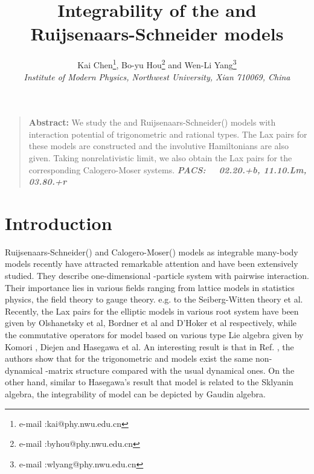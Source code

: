 \documentclass[a4paper,12pt]{article}
\providecommand{\sect}[1]{\setcounter{equation}{0}\section{#1}}
\begin{document}
\title{\textbf{Integrability of the \coordHE{} and \coordHE{} Ruijsenaars-Schneider
models}}
\author{Kai Chen\thanks{
e-mail :kai@phy.nwu.edu.cn}, Bo-yu Hou\thanks{
e-mail :byhou@phy.nwu.edu.cn} and Wen-Li Yang\thanks{
e-mail :wlyang@phy.nwu.edu.cn} \\
{\small \textit{Institute of Modern Physics, Northwest University, Xian
710069, China }}}
\date{}
\maketitle

\begin{quote}
{\bf Abstract:} We study the \coordHE{} and \coordHE{} Ruijsenaars-Schneider(\coordHE{}) models with
interaction potential of trigonometric and rational types. The Lax pairs for
these models are constructed and the involutive Hamiltonians are also given.
Taking nonrelativistic limit, we also obtain the Lax pairs for the
corresponding Calogero-Moser systems.\newline
\textbf{\textsl{\noindent PACS: \ \ 02.20.+b, 11.10.Lm, 03.80.+r}}
\end{quote}
\sect{Introduction}
Ruijsenaars-Schneider(\coordHE{}) and Calogero-Moser(\coordHE{}) models
as integrable many-body models recently have attracted remarkable attention
and have been extensively studied. They describe one-dimensional \coordHE{}%
-particle system with pairwise interaction. Their importance lies in various
fields ranging from lattice models in statistics physics\cite{h1, nksr}, the
field theory to gauge theory\cite{gm, n}. e.g. to the Seiberg-Witten theory
\cite{bmmm} et al. Recently, the Lax pairs for the elliptic \coordHE{} models in
various root system have been given by Olshanetsky et al\cite{op}, Bordner
et al\cite{bcs,bcs2,bcs3,bcs1} and D'Hoker et al\cite{hp1} respectively,
while the commutative operators for \coordHE{} model based on various type Lie
algebra given by Komori \cite{ko1, ko2}, Diejen\cite{di, di1} and Hasegawa%
\cite{h1, h2}et al. An interesting result is that in Ref. \cite{kai1}, the
authors show that for the \coordHE{} trigonometric \coordHE{} and \coordHE{} models exist the
same non-dynamical \coordHE{} -matrix structure compared with the usual dynamical
ones. On the other hand, similar to Hasegawa's result that \coordHE{}  \coordHE{}
model is related  to the \coordHE{} Sklyanin
algebra, the  integrability of	\coordHE{} model can be
depicted by \coordHE{} Gaudin algebra\cite{kai2}.
\end{document}
